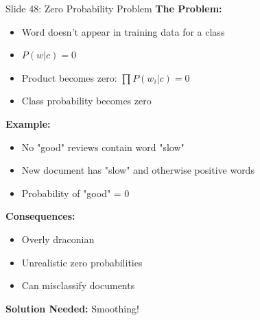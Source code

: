 \documentclass[8pt]{beamer}
\begin{document}
	\begin{frame}{Slide 48: Zero Probability Problem}
		\fontsize{6.5}{7.5}\selectfont
		\textbf{The Problem:}
		\begin{itemize}
			\item Word doesn't appear in training data for a class
			\item $P(w|c) = 0$
			\item Product becomes zero: $\prod P(w_i|c) = 0$
			\item Class probability becomes zero
		\end{itemize}
		
		\vspace{0.1cm}
		\textbf{Example:}
		\begin{itemize}
			\item No "good" reviews contain word "slow"
			\item New document has "slow" and otherwise positive words
			\item Probability of "good" = 0
		\end{itemize}
		
		\vspace{0.1cm}
		\textbf{Consequences:}
		\begin{itemize}
			\item Overly draconian
			\item Unrealistic zero probabilities
			\item Can misclassify documents
		\end{itemize}
		
		\textcolor{myblue}{\textbf{Solution Needed:}} Smoothing!
	\end{frame}
	
\end{document}
